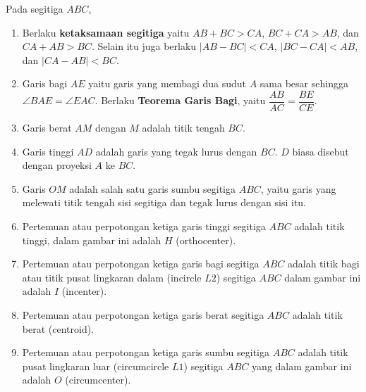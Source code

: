 \documentclass[11pt]{scrartcl}
\begin{document}
Pada segitiga $ABC$,
\begin{enumerate}
    \item Berlaku \textbf{ketaksamaan segitiga} yaitu $AB+BC>CA$, $BC+CA>AB$, dan $CA+AB>BC$. Selain itu juga berlaku $|AB-BC|<CA$, $|BC-CA|<AB$, dan $|CA-AB|<BC$.
    \item Garis bagi $AE$ yaitu garis yang membagi dua sudut $A$ sama besar sehingga $\angle BAE = \angle EAC$. Berlaku \textbf{Teorema Garis Bagi}, yaitu $\dfrac{AB}{AC}=\dfrac{BE}{CE}$.
    \item Garis berat $AM$ dengan $M$ adalah titik tengah $BC$.
    \item Garis tinggi $AD$ adalah garis yang tegak lurus dengan $BC$. $D$ biasa disebut dengan proyeksi $A$ ke $BC$.
    \item Garis $OM$ adalah salah satu garis sumbu segitiga $ABC$, yaitu garis yang melewati titik tengah sisi segitiga dan tegak lurus dengan sisi itu.
    \item Pertemuan atau perpotongan ketiga garis tinggi segitiga $ABC$ adalah titik tinggi, dalam gambar ini adalah $H$ (orthocenter).
    \item Pertemuan atau perpotongan ketiga garis bagi segitiga $ABC$ adalah titik bagi atau titik pusat lingkaran dalam (incircle $L2$) segitiga $ABC$ dalam gambar ini adalah $I$ (incenter).
    \item Pertemuan atau perpotongan ketiga garis berat segitiga $ABC$ adalah titik berat (centroid).
    \item Pertemuan atau perpotongan ketiga garis sumbu segitiga $ABC$ adalah titik pusat lingkaran luar (circumcircle $L1$) segitiga $ABC$ yang dalam gambar ini adalah $O$ (circumcenter).
\end{enumerate}
\end{document}

